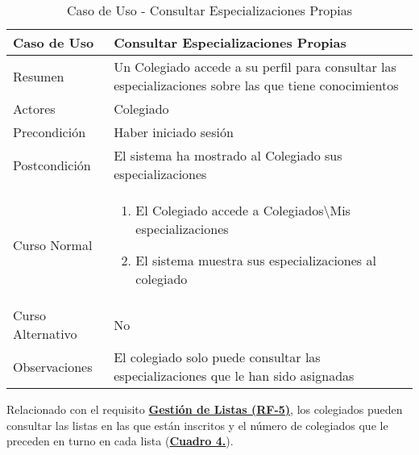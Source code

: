 \begin{table}[!htbp]
  \centering  \addtocounter{casouso}{1}
  \begin{tabular}{|l | p{100mm}|}
    \textbf{Caso de Uso}  & \textbf{Consultar Especializaciones Propias} \\ \hline
    Resumen 		 & Un Colegiado accede a su perfil para consultar las especializaciones sobre las que tiene conocimientos \\ \hline
    Actores  		 & Colegiado \\ \hline
    Precondición  	 & Haber iniciado sesión \\ \hline
    Postcondición  	 & El sistema ha mostrado al Colegiado sus especializaciones \\ \hline
    Curso Normal   	 & \begin{enumerate}
	  \item El Colegiado accede a Colegiados\textbackslash Mis especializaciones
	  \item El sistema muestra sus especializaciones al colegiado
    \end{enumerate}  \\ \hline
    Curso Alternativo  & No \\ \hline
    Observaciones 	 & El colegiado solo puede consultar las especializaciones que le han sido asignadas \\ \hline
  \end{tabular}
  \caption{Caso de Uso  - Consultar Especializaciones Propias}
  \label{tab:cucConsultaEspec}
\end{table}
\FloatBarrier

\addtocounter{tabla}{1}
Relacionado con el requisito \textbf{\hyperref[tab:rfGestLst]{Gestión de Listas (RF-5)}}, los colegiados pueden consultar las listas en las que están inscritos y el número de colegiados que le preceden en turno en cada lista (\textbf{\hyperref[tab:cucConsultaLista]{Cuadro 4.}}).

